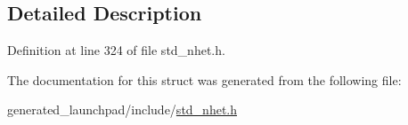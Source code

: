 \subsection{Detailed Description}


Definition at line 324 of file std\+\_\+nhet.\+h.



The documentation for this struct was generated from the following file\+:\begin{DoxyCompactItemize}
\item 
generated\+\_\+launchpad/include/\mbox{\hyperlink{std__nhet_8h}{std\+\_\+nhet.\+h}}\end{DoxyCompactItemize}
